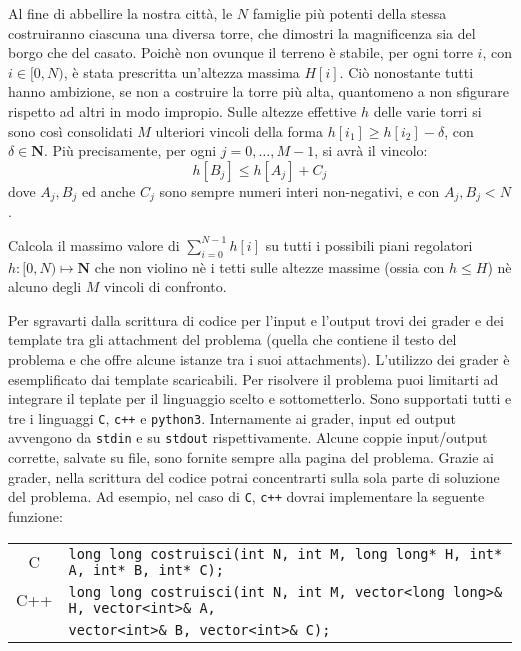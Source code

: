\renewcommand{\nomebreve}{linear\_diff\_constraints}
\renewcommand{\titolo}{Mal Comune Mezzo Gaudio - {\large ripreso dalle OII 2019}\\}

\introduzione{}

Al fine di abbellire la nostra città, le $N$ famiglie più potenti della stessa costruiranno ciascuna una diversa torre, che dimostri la magnificenza sia del borgo che del casato. Poichè non ovunque il terreno è stabile, per ogni torre $i$, con $i\in [0,N)$, è stata prescritta un'altezza massima $H[i]$. Ciò nonostante tutti hanno ambizione, se non a costruire la torre più alta, quantomeno a non sfigurare rispetto ad altri in modo impropio.
Sulle altezze effettive $h$ delle varie torri si sono così consolidati $M$ ulteriori vincoli della forma $h[i_1] \geq h[i_2] - \delta$, con $\delta \in  \mathbf{N}$. Più precisamente, per ogni $j=0,\ldots,M-1$, si avrà il vincolo:
\[
   h[B_j] \leq h[A_j] + C_j 
\]
dove $A_j, B_j$ ed anche $C_j$ sono sempre numeri interi non-negativi, e con $A_j, B_j < N$.

Calcola il massimo valore di $\sum_{i=0}^{N-1} h[i]$ su tutti i possibili piani regolatori $h:[0,N)\mapsto \mathbf{N}$ che non violino nè i tetti sulle altezze massime (ossia con $h\leq H$)  nè alcuno degli $M$ vincoli di confronto. 



Per sgravarti dalla scrittura di codice per l'input e l'output trovi dei grader e dei template tra gli attachment del problema (quella che contiene il testo del problema e che offre alcune istanze tra i suoi attachments). L'utilizzo dei grader è esemplificato dai template scaricabili. Per risolvere il problema puoi limitarti ad integrare il teplate per il linguaggio scelto e sottometterlo. Sono supportati tutti e tre i linguaggi \verb'C', \verb'c++' e \verb'python3'.
Internamente ai grader, input ed output avvengono da \verb'stdin' e su \verb'stdout' rispettivamente. Alcune coppie input/output corrette, salvate su file, sono fornite sempre alla pagina del problema.
Grazie ai grader, nella scrittura del codice potrai concentrarti sulla sola parte di soluzione del problema. Ad esempio, nel caso di \verb'C', \verb'c++' dovrai implementare la seguente funzione:

\begin{center}\begin{tabularx}{\textwidth}{|c|X|}
\hline
C  & \verb|long long costruisci(int N, int M, long long* H, int* A, int* B, int* C);|\\
C++ & \verb|long long costruisci(int N, int M, vector<long long>& H, vector<int>& A,|\\
& \hspace{4.25cm}\verb|vector<int>& B, vector<int>& C);|\\
\hline
\end{tabularx}\end{center}

